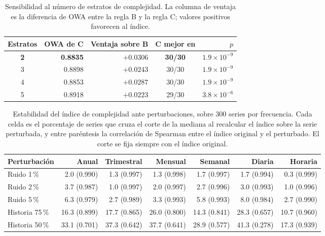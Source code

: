\begin{table}[htbp]
\centering
\caption{Sensibilidad al número de estratos de complejidad. La columna de ventaja es
la diferencia de OWA entre la regla B y la regla C; valores positivos favorecen al
índice.}
\label{tab:estratos}
\begin{tabular}{crrcr}
\toprule
\textbf{Estratos} & \textbf{OWA de C} & \textbf{Ventaja sobre B} &
\textbf{C mejor en} & \textbf{$p$} \\
\midrule
\textbf{2} & \textbf{0.8835} & \textbf{$+0.0306$} & \textbf{30/30} & $1.9\times10^{-9}$ \\
3 & 0.8898 & $+0.0243$ & 30/30 & $1.9\times10^{-9}$ \\
4 & 0.8853 & $+0.0287$ & 30/30 & $1.9\times10^{-9}$ \\
5 & 0.8918 & $+0.0223$ & 29/30 & $3.8\times10^{-6}$ \\
\bottomrule
\end{tabular}
\end{table}


\begin{table}[htbp]
\centering
\caption{Estabilidad del índice de complejidad ante perturbaciones, sobre 300 series
por frecuencia. Cada celda es el porcentaje de series que cruza el corte de la mediana
al recalcular el índice sobre la serie perturbada, y entre paréntesis la correlación de
Spearman entre el índice original y el perturbado. El corte se fija siempre con el
índice original.}
\label{tab:estabilidad}
\small
\setlength{\tabcolsep}{4.5pt}
\begin{tabular}{lrrrrrr}
\toprule
\textbf{Perturbación} & \textbf{Anual} & \textbf{Trimestral} & \textbf{Mensual} & \textbf{Semanal} & \textbf{Diaria} & \textbf{Horaria} \\
\midrule
Ruido 1\,\% & 2.0 (0.990) & 1.3 (0.997) & 1.3 (0.998) & 1.7 (0.997) & 1.7 (0.994) & 0.3 (0.999) \\
Ruido 2\,\% & 3.7 (0.987) & 1.0 (0.997) & 2.0 (0.997) & 2.7 (0.996) & 3.0 (0.993) & 1.0 (0.996) \\
Ruido 5\,\% & 6.3 (0.979) & 2.7 (0.989) & 3.3 (0.993) & 5.8 (0.993) & 8.0 (0.984) & 2.7 (0.990) \\
\midrule
Historia 75\,\% & 16.3 (0.899) & 17.7 (0.865) & 26.0 (0.800) & 14.3 (0.841) & 28.3 (0.657) & 10.7 (0.960) \\
Historia 50\,\% & 33.1 (0.701) & 37.3 (0.642) & 37.7 (0.641) & 28.9 (0.577) & 41.3 (0.278) & 17.3 (0.939) \\
\bottomrule
\end{tabular}
\end{table}


